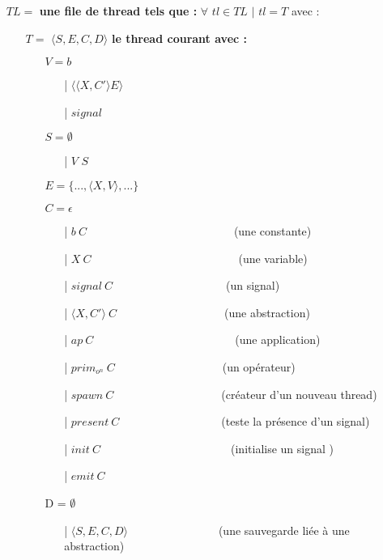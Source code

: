 \documentclass[10pt,a4paper]{article}
\begin{document}
				\begin{itemize}
					\item[] $TL =$ \textbf{une file de thread tels que :} $\forall$ $tl \in TL$ $|$ $tl = T$ avec :
					\begin{itemize}
						\item[] $T =$ $\langle S,E,C,D\rangle$ \textbf{le thread courant avec :}
						\begin{itemize}
							\item[] $V = b$	
							\begin{itemize}
								\item[|] $\langle\langle X,C' \rangle E\rangle$
								\item[|] $signal$
							\end{itemize}
							\item[] $S =  \emptyset$ 
							\begin{itemize}
								\item[|] $V$ $S$
							\end{itemize}
							\item[] $E = \{...,\langle X,V\rangle,...\}$
							\item[] $C = \epsilon$								
							\begin{itemize}
								\item[|] $b~C$~~~~~~~~~~~~~~~~~~~~~~~~~~(une constante)
								\item[|] $X~C$~~~~~~~~~~~~~~~~~~~~~~~~~~(une variable)
								\item[|] $signal~C$~~~~~~~~~~~~~~~~~~~~(un signal)
								\item[|] $\langle X,C'\rangle~C$~~~~~~~~~~~~~~~~~~~(une abstraction)
								\item[|] $ap~C$~~~~~~~~~~~~~~~~~~~~~~~~~(une application)
								\item[|] $prim_{o^{n}}~C$~~~~~~~~~~~~~~~~~~~(un opérateur)
								\item[|] $spawn~C$~~~~~~~~~~~~~~~~~~~(créateur d'un nouveau thread)
								\item[|] $present~C$~~~~~~~~~~~~~~~~~~(teste la présence d'un signal)
								\item[|] $init~C$~~~~~~~~~~~~~~~~~~~~~~~(initialise un signal )
								\item[|] $emit~C$
							\end{itemize}
							\item[] D = $\emptyset$
							\begin{itemize}
								\item[|] $\langle S,E,C,D\rangle$~~~~~~~~~~~~~~~~(une sauvegarde liée à une abstraction)

\end{itemize}
\end{itemize}
\end{itemize}
\end{itemize}
\end{document}
